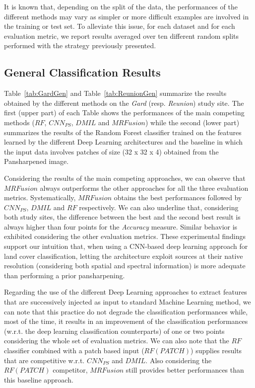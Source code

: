 \documentclass[journal]{IEEEtran}
\newcommand{\method}{$MRFusion$}
\begin{document}
It is known that, depending on the split of the data, the performances of the different methods may vary as simpler or more difficult examples are involved in the training or test set. To alleviate this issue, for each dataset and for each evaluation metric, we report results averaged over ten different random splits performed with the strategy previously presented.

\subsection{General Classification Results}
Table~\ref{tab:GardGen} and Table~\ref{tab:ReunionGen} summarize the results obtained by the different methods on the \textit{Gard} (resp. \textit{Reunion}) study site. The first (upper part) of each Table shows the performances of the main competing methods ($RF$, $CNN_{PS}$, $DMIL$ and \method{}) while the second (lower part) summarizes the results of the Random Forest classifier trained on the features learned by the different Deep Learning architectures and the baseline in which the input data involves patches of size (32 x 32 x 4) obtained from the Pansharpened image.

Considering the results of the main competing approaches, we can observe that \method{} always outperforms the other approaches for all the three evaluation metrics. Systematically, \method{} obtains the best performances followed by $CNN_{PS}$, $DMIL$ and $RF$ respectively. We can also underline that, considering both study sites, the difference between the best and the second best result is always higher than four points for the \textit{Accuracy} measure. Similar behavior is exhibited considering the other evaluation metrics.
These experimental findings support our intuition that, when using a CNN-based deep learning approach for land cover classification, letting the architecture exploit sources at their native resolution (considering both spatial and spectral information) is more adequate than performing a prior pansharpening.

Regarding the use of the different Deep Learning approaches to extract features that are successively injected as input to standard Machine Learning method, we can note that this practice do not degrade the classification performances while, most of the time, it results in an improvement of the classification performances (w.r.t. the deep learning classification counterparts) of one or two points considering the whole set of evaluation metrics.
We can also note that the $RF$ classifier combined with a patch based input ($RF(PATCH)$) supplies results that are competitive w.r.t. $CNN_{PS}$ and $DMIL$. Also considering the $RF(PATCH)$ competitor, \method{} still provides better performances than this baseline approach.
\end{document}
